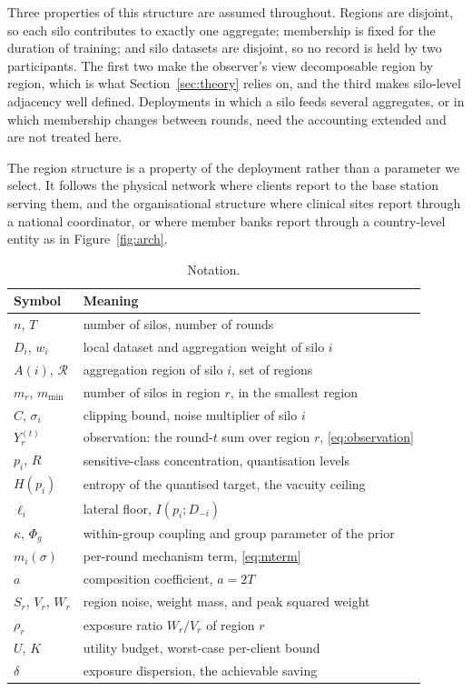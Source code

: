 \documentclass[acmsmall,screen,review,anonymous]{acmart}
\theoremstyle{acmdefinition}%
\newcommand{\Reg}{\mathcal{R}}
\begin{document}
Three properties of this structure are assumed throughout. Regions are disjoint, so
each silo contributes to exactly one aggregate; membership is fixed for the
duration of training; and silo datasets are disjoint, so no record is held by two
participants. The first two make the observer's view decomposable region by region,
which is what Section~\ref{sec:theory} relies on, and the third makes silo-level
adjacency well defined. Deployments in which a silo feeds several aggregates, or in
which membership changes between rounds, need the accounting extended and are not
treated here.

The region structure is a property of the deployment rather than a parameter we
select. It follows the physical network where clients report to the base station
serving them, and the organisational structure where clinical sites report through
a national coordinator, or where member banks report through a country-level
entity as in Figure~\ref{fig:arch}.

\begin{table}[t]
\caption{Notation.}
\label{tab:notation}
\centering
\footnotesize
\setlength{\tabcolsep}{4pt}
\begin{tabular}{@{}l p{}@{}}
\toprule
Symbol & Meaning \\
\midrule
$n$, $T$            & number of silos, number of rounds \\
$D_i$, $w_i$        & local dataset and aggregation weight of silo $i$ \\
$A(i)$, $\Reg$      & aggregation region of silo $i$, set of regions \\
$m_r$, $m_{\min}$   & number of silos in region $r$, in the smallest region \\
$C$, $\sigma_i$     & clipping bound, noise multiplier of silo $i$ \\
$Y_r^{(t)}$         & observation: the round-$t$ sum over region $r$, \eqref{eq:observation} \\
$p_i$, $R$          & sensitive-class concentration, quantisation levels \\
$H(p_i)$            & entropy of the quantised target, the vacuity ceiling \\
$\ell_i$            & lateral floor, $I(p_i; D_{-i})$ \\
$\kappa$, $\Phi_g$  & within-group coupling and group parameter of the prior \\
$m_i(\sigma)$       & per-round mechanism term, \eqref{eq:mterm} \\
$a$                 & composition coefficient, $a = 2T$ \\
$S_r$, $V_r$, $W_r$ & region noise, weight mass, and peak squared weight \\
$\rho_r$            & exposure ratio $W_r / V_r$ of region $r$ \\
$U$, $K$            & utility budget, worst-case per-client bound \\
$\delta$            & exposure dispersion, the achievable saving \\
\bottomrule
\end{tabular}
\end{table}
\end{document}
